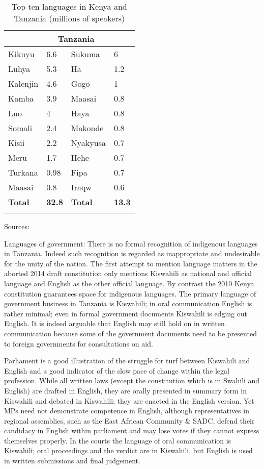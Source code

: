 \documentclass[output=paper,colorlinks,citecolor=brown]{langscibook}
\begin{document}
\begin{table}
    \begin{tabular}{llll}
    \lsptoprule
    \multicolumn{2}{c}{Kenya} & \multicolumn{2}{c}{Tanzania}\\
        \midrule
         Kikuyu & 6.6 &  Sukuma & 6 \\
          Luhya & 5.3 & Ha & 1.2 \\
          Kalenjin & 4.6  & Gogo & 1 \\
          Kamba & 3.9 & Maasai & 0.8 \\
          Luo & 4 & Haya & 0.8 \\
          Somali & 2.4 & Makonde & 0.8 \\
          Kisii & 2.2 & Nyakyusa & 0.7 \\
          Meru & 1.7 & Hehe & 0.7 \\
          Turkana & 0.98 & Fipa & 0.7 \\
          Maasai & 0.8 & Iraqw & 0.6 \\
        \midrule
    \textbf{Total} & \textbf{32.8} & \textbf{Total} & \textbf{13.3} \\
    \lspbottomrule
    \end{tabular}
    \caption{Top ten languages in Kenya and Tanzania (millions of speakers)}
    Sources: \cite{Kenya-National-Bureau-of-Statistics2009, Mradi-wa-Lugha-za-Tanzania2009}
    \label{tab:kioko:1}
\end{table}

Languages of government: There is no formal recognition of indigenous languages in Tanzania. Indeed such recognition is regarded as inappropriate and undesirable for the unity of the nation. The first attempt to mention language matters in the aborted 2014 draft constitution only mentions Kiswahili as national and official language and English as the other official language. By contrast the 2010 Kenya constitution guarantees space for indigenous languages. The primary language of government business in Tanzania is Kiswahili; in oral communication English is rather minimal; even in formal government documents Kiswahili is edging out English. It is indeed arguable that English may still hold on in written communication because some of the government documents need to be presented to foreign governments for consultations on aid.  

Parliament is a good illustration of the struggle for turf between Kiswahili and English and a good indicator of the slow pace of change within the legal profession.  While all written laws (except the constitution which is in Swahili and English) are drafted in English, they are orally presented in summary form in Kiswahili and debated in Kiswahili; they are enacted in the English version. Yet MPs need not demonstrate competence in English, although representatives in regional assemblies, such as the East African Community \& SADC, defend their candidacy in English within parliament and may lose votes if they cannot express themselves properly. In the courts the language of oral communication is Kiswahili; oral proceedings and the verdict are in Kiswahili, but English is used in written submissions and final judgement.
\end{document}
